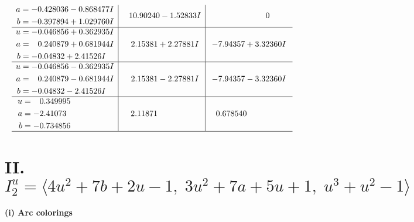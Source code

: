 \documentclass[1p]{elsarticle_modified}
\theoremstyle{definition}
\begin{document}
$$\begin{array}{c|c|c}
\begin{aligned}
a &= -0.428036 - 0.868477 I \\
b &= -0.397894 + 1.029760 I\end{aligned}
 & \phantom{-}10.90240 - 1.52833 I & \phantom{-0.000000 } 0 \\ \hline\begin{aligned}
u &= -0.046856 + 0.362935 I \\
a &= \phantom{-}0.240879 + 0.681944 I \\
b &= -0.04832 + 2.41526 I\end{aligned}
 & \phantom{-}2.15381 + 2.27881 I & -7.94357 + 3.32360 I \\ \hline\begin{aligned}
u &= -0.046856 - 0.362935 I \\
a &= \phantom{-}0.240879 - 0.681944 I \\
b &= -0.04832 - 2.41526 I\end{aligned}
 & \phantom{-}2.15381 - 2.27881 I & -7.94357 - 3.32360 I \\ \hline\begin{aligned}
u &= \phantom{-}0.349995\phantom{ +0.000000I} \\
a &= -2.41073\phantom{ +0.000000I} \\
b &= -0.734856\phantom{ +0.000000I}\end{aligned}
 & \phantom{-}2.11871\phantom{ +0.000000I} & \phantom{-}0.678540\phantom{ +0.000000I}\\
 \hline 
 \end{array}$$\newpage\newpage\renewcommand{\arraystretch}{1}
\centering \section*{II. $I^u_{2}= \langle 4 u^2+7 b+2 u-1,\;3 u^2+7 a+5 u+1,\;u^3+u^2-1 \rangle$}
\flushleft \textbf{(i) Arc colorings}\\
\end{document}
